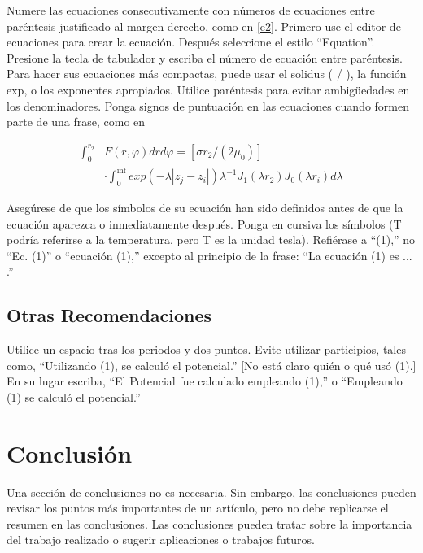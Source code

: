 \documentclass[final,5p,times,twocolumn,authoryear,10pt]{elsarticle}
\begin{document}
Numere las ecuaciones consecutivamente con números de ecuaciones entre paréntesis justificado al margen derecho, como en \eqref{e2}. Primero use el editor de ecuaciones para crear la ecuación. Después seleccione el estilo “Equation”. Presione la tecla de tabulador y escriba el número de ecuación entre paréntesis. Para hacer sus ecuaciones más compactas, puede usar el solidus ( / ), la función exp, o los exponentes apropiados. Utilice paréntesis para evitar ambigüedades en los denominadores. Ponga signos de puntuación en las ecuaciones cuando formen parte de una frase, como en

\begin{equation} \label{e2}
\begin{array}{ll}
\int_0^{r_2} & F (r, \varphi ) dr d\varphi = [\sigma r_2 / (2 \mu_0 )] \\
& \cdot \int_0^{\inf} exp(-\lambda |z_j - z_i |) \lambda^{-1} J_1 (\lambda  r_2 ) J_0 (\lambda r_i ) d\lambda
\end{array}
\end{equation}

Asegúrese de que los símbolos de su ecuación han sido definidos antes de que la ecuación aparezca o inmediatamente después. Ponga en cursiva los símbolos (T podría referirse a la temperatura, pero T es la unidad tesla). Refiérase a “(1),” no “Ec. (1)” o “ecuación (1),” excepto al principio de la frase: “La ecuación (1) es ... .”

\subsection{Otras Recomendaciones}

Utilice un espacio tras los periodos y dos puntos. Evite utilizar participios, tales como, “Utilizando (1), se calculó el potencial.” [No está claro quién o qué usó (1).] En su lugar escriba, “El Potencial fue calculado empleando (1),” o “Empleando (1) se calculó el potencial.”

\section{Conclusión}

Una sección de conclusiones no es necesaria. Sin embargo, las conclusiones pueden revisar los puntos más importantes de un artículo, pero no debe replicarse el resumen en las conclusiones. Las conclusiones pueden tratar sobre la importancia del trabajo realizado o sugerir aplicaciones o trabajos futuros.
\end{document}
